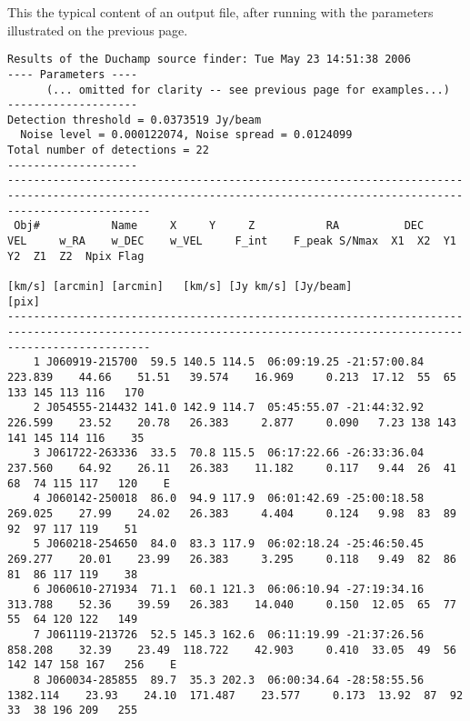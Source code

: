 \begin{landscape}
\label{app-output}
This the typical content of an output file, after running \duchamp
with the parameters illustrated on the previous page. 

{\tiny 
  \begin{verbatim}
Results of the Duchamp source finder: Tue May 23 14:51:38 2006
---- Parameters ----
      (... omitted for clarity -- see previous page for examples...)
--------------------
Detection threshold = 0.0373519 Jy/beam
  Noise level = 0.000122074, Noise spread = 0.0124099
Total number of detections = 22
--------------------
------------------------------------------------------------------------------------------------------------------------------------------------------------------
 Obj#           Name     X     Y     Z           RA          DEC      VEL     w_RA    w_DEC    w_VEL     F_int    F_peak S/Nmax  X1  X2  Y1  Y2  Z1  Z2  Npix Flag
                                                                   [km/s] [arcmin] [arcmin]   [km/s] [Jy km/s] [Jy/beam]                                [pix]     
------------------------------------------------------------------------------------------------------------------------------------------------------------------
    1 J060919-215700  59.5 140.5 114.5  06:09:19.25 -21:57:00.84  223.839    44.66    51.51   39.574    16.969     0.213  17.12  55  65 133 145 113 116   170     
    2 J054555-214432 141.0 142.9 114.7  05:45:55.07 -21:44:32.92  226.599    23.52    20.78   26.383     2.877     0.090   7.23 138 143 141 145 114 116    35     
    3 J061722-263336  33.5  70.8 115.5  06:17:22.66 -26:33:36.04  237.560    64.92    26.11   26.383    11.182     0.117   9.44  26  41  68  74 115 117   120    E
    4 J060142-250018  86.0  94.9 117.9  06:01:42.69 -25:00:18.58  269.025    27.99    24.02   26.383     4.404     0.124   9.98  83  89  92  97 117 119    51     
    5 J060218-254650  84.0  83.3 117.9  06:02:18.24 -25:46:50.45  269.277    20.01    23.99   26.383     3.295     0.118   9.49  82  86  81  86 117 119    38     
    6 J060610-271934  71.1  60.1 121.3  06:06:10.94 -27:19:34.16  313.788    52.36    39.59   26.383    14.040     0.150  12.05  65  77  55  64 120 122   149     
    7 J061119-213726  52.5 145.3 162.6  06:11:19.99 -21:37:26.56  858.208    32.39    23.49  118.722    42.903     0.410  33.05  49  56 142 147 158 167   256    E
    8 J060034-285855  89.7  35.3 202.3  06:00:34.64 -28:58:55.56 1382.114    23.93    24.10  171.487    23.577     0.173  13.92  87  92  33  38 196 209   255     

\end{verbatim}}
\end{landscape}
